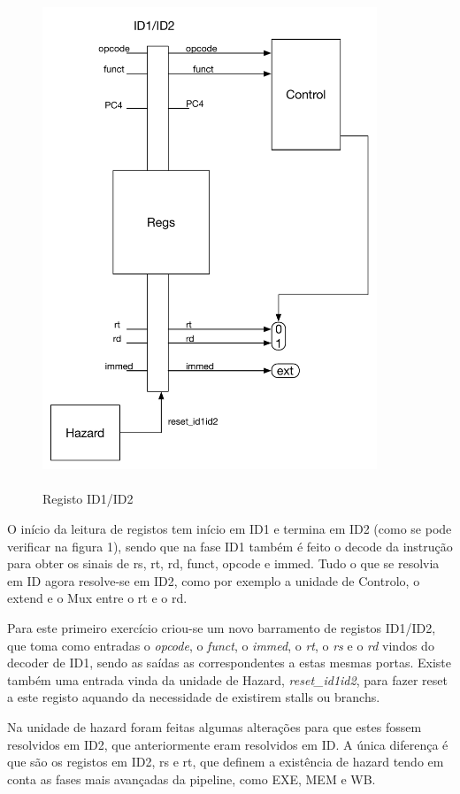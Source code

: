 \documentclass[pdftex,12pt,a4paper]{report}
\begin{document}
\begin{figure}[!htb]
\center
 \includegraphics[width=100mm,scale=1]{ID1ID2ex1.pdf}
 \caption{\\ Registo ID1/ID2}
 \label{fig:ex1RegID1ID2}
\end{figure}

O início da leitura de registos tem início em ID1 e termina em ID2 (como se pode verificar na figura 1), sendo que na fase ID1 também é feito o decode da instrução para obter os sinais de rs, rt, rd, funct, opcode e immed.  Tudo o que se resolvia em ID agora resolve-se em ID2, como por exemplo a unidade de Controlo, o extend e o Mux entre o rt e o rd.

Para este primeiro exercício criou-se um novo barramento de registos ID1/ID2, que toma como entradas o \textit{opcode}, o \textit{funct}, o \textit{immed}, o \textit{rt}, o \textit{rs} e o \textit{rd} vindos do decoder de ID1, sendo as saídas as correspondentes a estas mesmas portas. Existe também uma entrada vinda da unidade de Hazard, \textit{reset\_id1id2}, para fazer reset a este registo aquando da necessidade de existirem stalls ou branchs.

Na unidade de hazard foram feitas algumas alterações para que estes fossem resolvidos em ID2, que anteriormente eram resolvidos em ID. A única diferença é que são os registos em ID2, rs e rt, que definem a existência de hazard tendo em conta as fases mais avançadas da pipeline, como EXE, MEM e WB.
\end{document}
